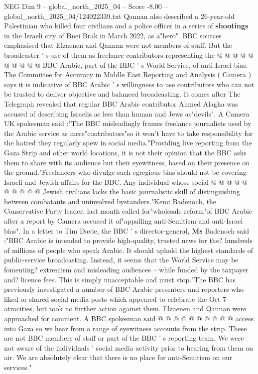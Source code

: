 \begin{textsample}{NEG Dim 9 – global\_north\_2025\_04 – Score -8.00 – global\_north\_2025\_04/124022339.txt}
Qannan also described a 26-year-old Palestinian who killed four civilians and a police officer in a series of \textbf{shootings} in the Israeli city of Bnei Brak in March 2022, as a"hero".
BBC sources emphasised that Elzaenen and Qannan were not members of staff.
But the broadcaster ' s use of them as freelance contributors representing the @ @ @ @ @ @ @ @ @ @ BBC Arabic, part of the BBC ' s World Service, of anti-Israel bias.
The Committee for Accuracy in Middle East Reporting and Analysis ( Camera ) says it is indicative of BBC Arabic ' s willingness to use contributors who can not be trusted to deliver objective and balanced broadcasting.
It comes after The Telegraph revealed that regular BBC Arabic contributor Ahmed Alagha was accused of describing Israelis as less than human and Jews as"devils".
A Camera UK spokesman said :"The BBC misleadingly frames freelance journalists used by the Arabic service as mere"contributors"so it won't have to take responsibility for the hatred they regularly spew in social media."Providing live reporting from the Gaza Strip and other world locations, it is not their opinion that the BBC asks them to share with its audience but their eyewitness, based on their presence on the ground."Freelancers who divulge such egregious bias should not be covering Israeli and Jewish affairs for the BBC.
Any individual whose social @ @ @ @ @ @ @ @ @ @ Jewish civilians lacks the basic journalistic skill of distinguishing between combatants and uninvolved bystanders."Kemi Badenoch, the Conservative Party leader, last month called for"wholesale reform"of BBC Arabic after a report by Camera accused it of"appalling anti-Semitism and anti-Israel bias".
In a letter to Tim Davie, the BBC ' s director-general, \textbf{Ms} Badenoch said :"BBC Arabic is intended to provide high-quality, trusted news for the? hundreds of millions of people who speak Arabic.
It should uphold the highest standards of public-service broadcasting.
Instead, it seems that the World Service may be fomenting? extremism and misleading audiences -- while funded by the taxpayer and? licence fees.
This is simply unacceptable and must stop."The BBC has previously investigated a number of BBC Arabic presenters and reporters who liked or shared social media posts which appeared to celebrate the Oct 7 atrocities, but took no further action against them.
Elzaenen and Qannan were approached for comment.
A BBC spokesman said @ @ @ @ @ @ @ @ @ @ access into Gaza so we hear from a range of eyewitness accounts from the strip.
These are not BBC members of staff or part of the BBC ' s reporting team.
We were not aware of the individuals ' social media activity prior to hearing from them on air.
We are absolutely clear that there is no place for anti-Semitism on our services."

\end{textsample}

